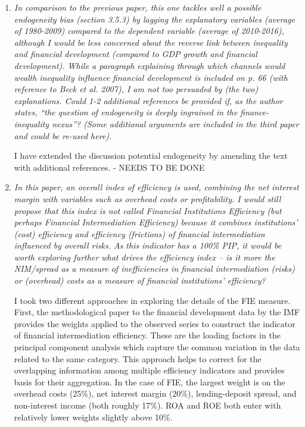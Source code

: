\begin{enumerate}[resume]

    \item \textit{In comparison to the previous paper, this one tackles well a possible endogeneity bias (section 3.5.3) by lagging the explanatory variables (average of 1980-2009) compared to the dependent variable (average of 2010-2016), although I would be less concerned about the reverse link between inequality and financial development (compared to GDP growth and financial development). While a paragraph explaining through which channels would wealth inequality influence financial development is included on p. 66 (with reference to Beck et al. 2007), I am not too persuaded by (the two) explanations. Could 1-2 additional references be provided if, as the author states, ``the question of endogeneity is deeply ingrained in the finance-inequality nexus''? (Some additional arguments are included in the third paper and could be re-used here).}
    
    {\color{red}I have extended the discussion potential endogeneity by amending the text with additional references. - NEEDS TO BE DONE}
    
    \item \textit{In this paper, an overall index of efficiency is used, combining the net interest margin with variables such as overhead costs or profitability. I would still propose that this index is not called Financial Institutions Efficiency (but perhaps Financial Intermediation Efficiency) because it combines institutions' (cost) efficiency and efficiency (frictions) of financial intermediation influenced by overall risks. As this indicator has a 100\% PIP, it would be worth exploring further what drives the efficiency index -- is it more the NIM/spread as a measure of inefficiencies in financial intermediation (risks) or (overhead) costs as a measure of financial institutions' efficiency?}
    
    I took two different approaches in exploring the details of the FIE measure. First, the methodological paper to the financial development data by the IMF \parencite{svirydzenka2016introducing} provides the weights applied to the observed series to construct the indicator of financial intermediation efficiency. These are the loading factors in the principal component analysis which capture the common variation in the data related to the same category. This approach helps to correct for the overlapping information among multiple efficiency indicators and provides basis for their aggregation. In the case of FIE, the largest weight is on the overhead costs (25\%), net interest margin (20\%), lending-deposit spread, and non-interest income (both roughly 17\%). ROA and ROE both enter with relatively lower weights slightly above 10\%.


\end{enumerate}
